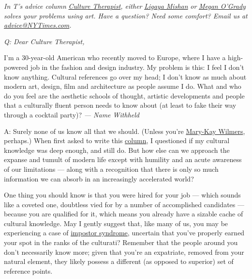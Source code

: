 \emph{In T's advice column}
\href{https://www.nytimes3xbfgragh.onion/column/culture-therapist?module=inline}{\emph{Culture
Therapist}}\emph{, either}
\href{https://www.nytimes3xbfgragh.onion/by/ligaya-mishan?module=inline}{\emph{Ligaya
Mishan}} \emph{or}
\href{https://www.nytimes3xbfgragh.onion/by/megan-o-grady?module=inline}{\emph{Megan
O'Grady}} \emph{solves your problems using art. Have a question? Need
some comfort? Email us at}
\href{mailto:advice@NYTimes.com}{\emph{advice@NYTimes.com}}\emph{.}

\emph{Q: Dear Culture Therapist,}

I'm a 30-year-old American who recently moved to Europe, where I have a
high-powered job in the fashion and design industry. My problem is this:
I feel I don't know anything. Cultural references go over my head; I
don't know as much about modern art, design, film and architecture as
people assume I do. What and who do you feel are the aesthetic schools
of thought, artistic developments and people that a culturally fluent
person needs to know about (at least to fake their way through a
cocktail party)? \emph{--- Name Withheld}

A: Surely none of us know all that we should. (Unless you're
\href{https://www.nytimes3xbfgragh.onion/2019/10/24/magazine/london-review-of-books-mary-kay-wilmers.html}{Mary-Kay
Wilmers}, perhaps.) When first asked to write this
\href{https://www.nytimes3xbfgragh.onion/column/culture-therapist}{column},
I questioned if my cultural knowledge was deep enough, and still do. But
how else can we approach the expanse and tumult of modern life except
with humility and an acute awareness of our limitations --- along with a
recognition that there is only so much information we can absorb in an
increasingly accelerated world?

One thing you should know is that you were hired for your job --- which
sounds like a coveted one, doubtless vied for by a number of
accomplished candidates --- because you are qualified for it, which
means you already have a sizable cache of cultural knowledge. May I
gently suggest that, like many of us, you may be experiencing a case of
\href{https://www.nytimes3xbfgragh.onion/guides/working-womans-handbook/overcome-impostor-syndrome}{impostor
syndrome}, uncertain that you've properly earned your spot in the ranks
of the culturati? Remember that the people around you don't necessarily
know more; given that you're an expatriate, removed from your natural
element, they likely possess a different (as opposed to superior) set of
reference points.

